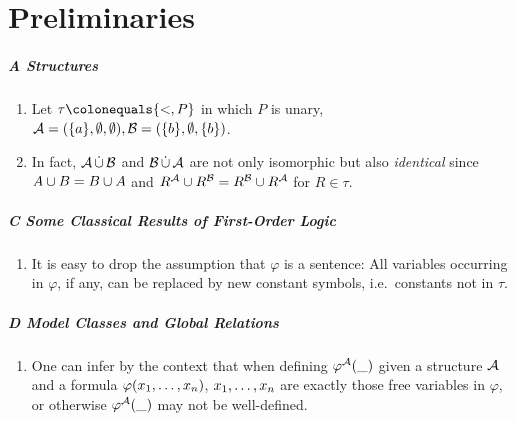 \chapter{Preliminaries}
\paragraph{A Structures}
\begin{enumerate}[1.]
%
\item {} Let $\tau \defas \sete{{<}, P}$ in which $P$ is unary, $\mathcal{A} = ({\{a\}}, \emptyset, \emptyset), \mathcal{B} = ({\{b\}}, \emptyset, {\{b\}})$.
%
\item {} In fact, $\mathcal{A} \mathop{\dot{\cup}} \mathcal{B}$ and $\mathcal{B} \mathop{\dot{\cup}} \mathcal{A}$ are not only isomorphic but also \emph{identical} since $A \cup B = B \cup A$ and $R^{\mathcal{A}} \cup R^{\mathcal{B}} = R^{\mathcal{B}} \cup R^{\mathcal{A}}$ for $R \in \tau$.
%
\end{enumerate}
\paragraph{C Some Classical Results of First-Order Logic}
\begin{enumerate}[1.]
%
\item {} It is easy to drop the assumption that $\varphi$ is a sentence: All variables occurring in $\varphi$, if any, can be replaced by new constant symbols, i.e.\ constants not in $\tau$.
%
\end{enumerate}
\paragraph{D Model Classes and Global Relations}
\begin{enumerate}[1.]
%
\item {} One can infer by the context that when defining ${\varphi^{\mathcal{A}}(\_)}$ given a structure $\mathcal{A}$ and a formula $\varphi(x_{1}, \ldots, x_{n})$, $x_{1}, \ldots, x_{n}$ are exactly those free variables in $\varphi$, or otherwise ${\varphi^{\mathcal{A}}(\_)}$ may not be well-defined.
%
\end{enumerate}
